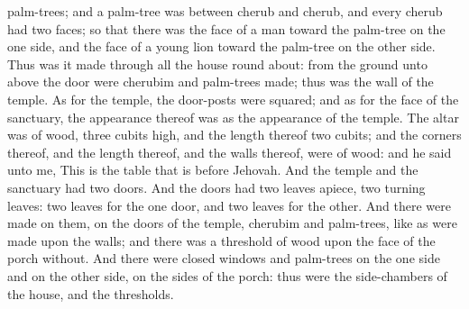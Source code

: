 palm-trees; and a palm-tree was between cherub and cherub, and every cherub had two faces; so that there was the face of a man toward the palm-tree on the one side, and the face of a young lion toward the palm-tree on the other side. Thus was it made through all the house round about: from the ground unto above the door were cherubim and palm-trees made; thus was the wall of the temple.  As for the temple, the door-posts were squared; and as for the face of the sanctuary, the appearance thereof was as the appearance of the temple. The altar was of wood, three cubits high, and the length thereof two cubits; and the corners thereof, and the length thereof, and the walls thereof, were of wood: and he said unto me, This is the table that is before Jehovah. And the temple and the sanctuary had two doors. And the doors had two leaves apiece, two turning leaves: two leaves for the one door, and two leaves for the other. And there were made on them, on the doors of the temple, cherubim and palm-trees, like as were made upon the walls; and there was a threshold of wood upon the face of the porch without. And there were closed windows and palm-trees on the one side and on the other side, on the sides of the porch: thus were the side-chambers of the house, and the thresholds. 

